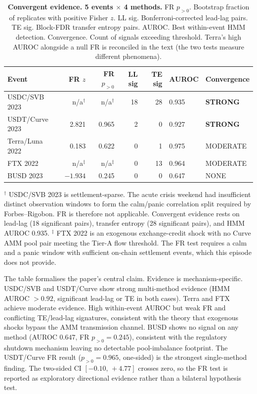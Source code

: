 \documentclass[sigconf,anonymous]{acmart}
\begin{document}
\begin{table}[t]
\centering
\caption{\textbf{Convergent evidence. 5 events $\times$ 4 methods.}
  FR $p_{>0}$. Bootstrap fraction of replicates with positive Fisher $z$.
  LL sig. Bonferroni-corrected lead-lag pairs.  TE sig. Block-FDR transfer entropy pairs.
  AUROC. Best within-event HMM detection.  Convergence. Count of signals exceeding threshold.
  Terra's high AUROC alongside a null FR is reconciled in the text (the two tests measure
  different phenomena).}
\label{tab:convergent}
\small
\setlength{\tabcolsep}{2pt}
\begin{tabular}{@{}lrrrrll@{}}
\toprule
Event & FR $z$ & FR $p_{>0}$ & LL sig & TE sig & AUROC & Convergence \\
\midrule
USDC/SVB 2023   & n/a$^\dagger$ & n/a$^\dagger$ & 18 & 28 & 0.935 & \textbf{STRONG} \\
USDT/Curve 2023 & 2.821 & 0.965 &  2 &  0 & 0.927 & \textbf{STRONG} \\
Terra/Luna 2022 & 0.183 & 0.622 &  0 &  1 & 0.975 & MODERATE \\
FTX 2022        & n/a$^\ddagger$ & n/a$^\ddagger$ &  0 & 13 & 0.964 & MODERATE \\
BUSD 2023       & $-1.934$ & 0.245 & 0 & 0 & 0.647 & NONE \\
\bottomrule
\end{tabular}
\par\smallskip
{\footnotesize $^\dagger$ USDC/SVB 2023 is settlement-sparse. The acute crisis weekend
had insufficient distinct observation windows to form the calm/panic correlation split required
by Forbes--Rigobon.  FR is therefore not applicable. Convergent evidence rests on
lead-lag (18 significant pairs), transfer entropy (28 significant pairs), and HMM AUROC 0.935.
$^\ddagger$ FTX 2022 is an exogenous exchange-credit shock with no Curve AMM pool pair meeting
the Tier-A flow threshold. The FR test requires a calm and a panic window with sufficient
on-chain settlement events, which this episode does not provide.}
\end{table}

The table formalises the paper's central claim. Evidence is mechanism-specific.
USDC/SVB and USDT/Curve show strong multi-method evidence (HMM AUROC $>0.92$, significant lead-lag or TE in both cases).
Terra and FTX achieve moderate evidence. High within-event AUROC but weak FR and conflicting TE/lead-lag signatures, consistent with the theory that exogenous shocks bypass the AMM transmission channel.
BUSD shows no signal on any method (AUROC $0.647$, FR $p_{>0}=0.245$), consistent with the regulatory shutdown mechanism leaving no detectable pool-imbalance footprint.
The USDT/Curve FR result ($p_{>0}=0.965$, one-sided) is the strongest single-method finding. The two-sided CI $[-0.10,\,+4.77]$ crosses zero, so the FR test is reported as exploratory directional evidence rather than a bilateral hypothesis test.
\end{document}
